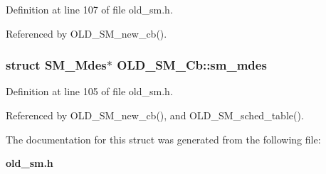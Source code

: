Definition at line 107 of file old\_\-sm.h.

Referenced by OLD\_\-SM\_\-new\_\-cb().
\subsubsection{\setlength{\rightskip}{0pt plus 5cm}struct SM\_\-Mdes$\ast$ \bf{OLD\_\-SM\_\-Cb::sm\_\-mdes}}\label{structOLD__SM__Cb_b6289fef8df5372c3a9b4556b88c38ea}




Definition at line 105 of file old\_\-sm.h.

Referenced by OLD\_\-SM\_\-new\_\-cb(), and OLD\_\-SM\_\-sched\_\-table().

The documentation for this struct was generated from the following file:\begin{CompactItemize}
\item 
\bf{old\_\-sm.h}\end{CompactItemize}
